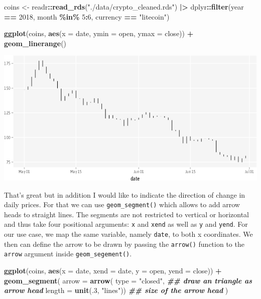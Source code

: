 \documentclass[
]{krantz}
\makeatletter
\newenvironment{Shaded}{\begin{snugshade}}{\end{snugshade}}
\newcommand{\AttributeTok}[1]{\textcolor[rgb]{0.27,0.27,0.27}{#1}}
\newcommand{\DecValTok}[1]{\textcolor[rgb]{0.06,0.06,0.06}{#1}}
\newcommand{\DocumentationTok}[1]{\textcolor[rgb]{0.37,0.37,0.37}{\textbf{\textit{#1}}}}
\newcommand{\FunctionTok}[1]{\textcolor[rgb]{0.27,0.27,0.27}{\textbf{#1}}}
\newcommand{\NormalTok}[1]{#1}
\newcommand{\OtherTok}[1]{\textcolor[rgb]{0.37,0.37,0.37}{#1}}
\newcommand{\SpecialCharTok}[1]{\textcolor[rgb]{0.43,0.43,0.43}{\textbf{#1}}}
\newcommand{\StringTok}[1]{\textcolor[rgb]{0.5,0.5,0.5}{#1}}
\newenvironment{kframe}{%
\medskip{}
\setlength{\fboxsep}{.8em}
 \def\at@end@of@kframe{}%
 \ifinner\ifhmode%
  \def\at@end@of@kframe{\end{minipage}}%
  \begin{minipage}{\columnwidth}%
 \fi\fi%
 \def\FrameCommand##1{\hskip\@totalleftmargin \hskip-\fboxsep
 \colorbox{shadecolor}{##1}\hskip-\fboxsep
     \hskip-\linewidth \hskip-\@totalleftmargin \hskip\columnwidth}%
 \MakeFramed {\advance\hsize-\width
   \@totalleftmargin\z@ \linewidth\hsize
   \@setminipage}}%
 {\par\unskip\endMakeFramed%
 \at@end@of@kframe}
\renewenvironment{Shaded}{\begin{kframe}}{\end{kframe}}
\makeatother
\begin{document}
\begin{Shaded}
\begin{Highlighting}[]
\NormalTok{coins }\OtherTok{\textless{}{-}}\NormalTok{ readr}\SpecialCharTok{::}\FunctionTok{read\_rds}\NormalTok{(}\StringTok{"./data/crypto\_cleaned.rds"}\NormalTok{) }\SpecialCharTok{|\textgreater{}} 
\NormalTok{  dplyr}\SpecialCharTok{::}\FunctionTok{filter}\NormalTok{(year }\SpecialCharTok{==} \DecValTok{2018}\NormalTok{, month }\SpecialCharTok{\%in\%} \DecValTok{5}\SpecialCharTok{:}\DecValTok{6}\NormalTok{, currency }\SpecialCharTok{==} \StringTok{"litecoin"}\NormalTok{)}

\FunctionTok{ggplot}\NormalTok{(coins, }\FunctionTok{aes}\NormalTok{(}\AttributeTok{x =}\NormalTok{ date, }\AttributeTok{ymin =}\NormalTok{ open, }\AttributeTok{ymax =}\NormalTok{ close)) }\SpecialCharTok{+}
  \FunctionTok{geom\_linerange}\NormalTok{()}
\end{Highlighting}
\end{Shaded}

\includegraphics{bookdown_files/figure-latex/07layerPositionalInputsLinerange-1.png}

That's great but in addition I would like to indicate the direction of change in daily prices. For that we can use \texttt{geom\_segment()} which allows to add arrow heads to straight lines. The segments are not restricted to vertical or horizontal and thus take four positional arguments: \texttt{x} and \texttt{xend} as well as \texttt{y} and \texttt{yend}. For our use case, we map the same variable, namely \texttt{date}, to both x coordinates. We then can define the arrow to be drawn by passing the \texttt{arrow()} function to the \texttt{arrow} argument inside \texttt{geom\_segement()}.

\begin{Shaded}
\begin{Highlighting}[]
\FunctionTok{ggplot}\NormalTok{(coins, }\FunctionTok{aes}\NormalTok{(}\AttributeTok{x =}\NormalTok{ date, }\AttributeTok{xend =}\NormalTok{ date, }
                  \AttributeTok{y =}\NormalTok{ open, }\AttributeTok{yend =}\NormalTok{ close)) }\SpecialCharTok{+}
  \FunctionTok{geom\_segment}\NormalTok{(}
    \AttributeTok{arrow =} \FunctionTok{arrow}\NormalTok{(}
      \AttributeTok{type =} \StringTok{"closed"}\NormalTok{, }\DocumentationTok{\#\# draw an triangle as arrow head }
      \AttributeTok{length =} \FunctionTok{unit}\NormalTok{(.}\DecValTok{3}\NormalTok{, }\StringTok{"lines"}\NormalTok{)) }\DocumentationTok{\#\# size of the arrow head}
\NormalTok{  )}
\end{Highlighting}
\end{Shaded}
\end{document}
